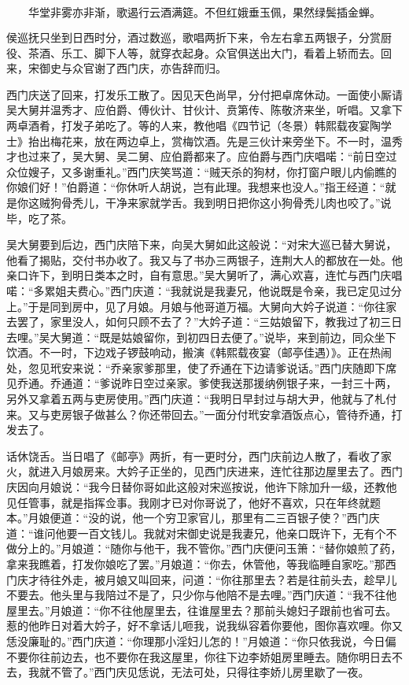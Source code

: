 \[
华堂非雾亦非渐，歌遏行云酒满筵。
不但红娥垂玉佩，果然绿鬓插金蝉。
\]

侯巡抚只坐到日西时分，酒过数巡，歌唱两折下来，令左右拿五两银子，分赏厨役、茶酒、乐工、脚下人等，就穿衣起身。众官俱送出大门，看着上轿而去。回来，宋御史与众官谢了西门庆，亦告辞而归。

西门庆送了回来，打发乐工散了。因见天色尚早，分付把卓席休动。一面使小厮请吴大舅并温秀才、应伯爵、傅伙计、甘伙计、贲第传、陈敬济来坐，听唱。又拿下两卓酒肴，打发子弟吃了。等的人来，教他唱《四节记（冬景）韩熙载夜宴陶学士》抬出梅花来，放在两边卓上，赏梅饮酒。先是三伙计来旁坐下。不一时，温秀才也过来了，吴大舅、吴二舅、应伯爵都来了。应伯爵与西门庆唱喏：“前日空过众位嫂子，又多谢重礼。”西门庆笑骂道：“贼天杀的狗材，你打窗户眼儿内偷瞧的你娘们好！”伯爵道：“你休听人胡说，岂有此理。我想来也没人。”指王经道：“就是你这贼狗骨秃儿，干净来家就学舌。我到明日把你这小狗骨秃儿肉也咬了。”说毕，吃了茶。

吴大舅要到后边，西门庆陪下来，向吴大舅如此这般说：“对宋大巡已替大舅说，他看了揭贴，交付书办收了。我又与了书办三两银子，连荆大人的都放在一处。他亲口许下，到明日类本之时，自有意思。”吴大舅听了，满心欢喜，连忙与西门庆唱喏：“多累姐夫费心。”西门庆道：“我就说是我妻兄，他说既是令亲，我已定见过分上。”于是同到房中，见了月娘。月娘与他哥道万福。大舅向大妗子说道：“你往家去罢了，家里没人，如何只顾不去了？”大妗子道：“三姑娘留下，教我过了初三日去哩。”吴大舅道：“既是姑娘留你，到初四日去便了。”说毕，来到前边，同众坐下饮酒。不一时，下边戏子锣鼓响动，搬演《韩熙载夜宴（邮亭佳遇）》。正在热闹处，忽见玳安来说：“乔亲家爹那里，使了乔通在下边请爹说话。”西门庆随即下席见乔通。乔通道：“爹说昨日空过亲家。爹使我送那援纳例银子来，一封三十两，另外又拿着五两与吏房使用。”西门庆道：“我明日早封过与胡大尹，他就与了札付来。又与吏房银子做甚么？你还带回去。”一面分付玳安拿酒饭点心，管待乔通，打发去了。

话休饶舌。当日唱了《邮亭》两折，有一更时分，西门庆前边人散了，看收了家火，就进入月娘房来。大妗子正坐的，见西门庆进来，连忙往那边屋里去了。西门庆因向月娘说：“我今日替你哥如此这般对宋巡按说，他许下除加升一级，还教他见任管事，就是指挥佥事。我刚才已对你哥说了，他好不喜欢，只在年终就题本。”月娘便道：“没的说，他一个穷卫家官儿，那里有二三百银子使？”西门庆道：“谁问他要一百文钱儿。我就对宋御史说是我妻兄，他亲口既许下，无有个不做分上的。”月娘道：“随你与他干，我不管你。”西门庆便问玉箫：“替你娘煎了药，拿来我瞧着，打发你娘吃了罢。”月娘道：“你去，休管他，等我临睡自家吃。”那西门庆才待往外走，被月娘又叫回来，问道：“你往那里去？若是往前头去，趁早儿不要去。他头里与我陪过不是了，只少你与他陪不是去哩。”西门庆道：“我不往他屋里去。”月娘道：“你不往他屋里去，往谁屋里去？那前头媳妇子跟前也省可去。惹的他昨日对着大妗子，好不拿话儿咂我，说我纵容着你要他，图你喜欢哩。你又恁没廉耻的。”西门庆道：“你理那小淫妇儿怎的！”月娘道：“你只依我说，今日偏不要你往前边去，也不要你在我这屋里，你往下边李娇姐房里睡去。随你明日去不去，我就不管了。”西门庆见恁说，无法可处，只得往李娇儿房里歇了一夜。

